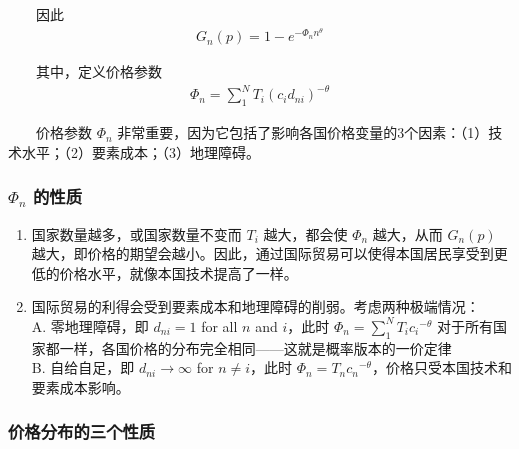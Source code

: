 \documentclass[]{article}
\providecommand{\tightlist}{%
  \setlength{\itemsep}{0pt}\setlength{\parskip}{0pt}}
\begin{document}
　　因此
\begin{align}
G_{n}(p)=1-e^{-\Phi_{n} n^{\theta}}  \label{eq:6}
\end{align}

　　其中，定义价格参数
\begin{align}
\Phi_{n} = \sum_{1}^{N}T_{i} ( {{c_i}d_{ni}})^{-\theta}  \label{eq:7}
\end{align}

　　价格参数 \(\Phi_n\) 非常重要，因为它包括了影响各国价格变量的3个因素：（1）技术水平；（2）要素成本；（3）地理障碍。

\hypertarget{phi_n-}{%
\subsubsection{\texorpdfstring{\(\Phi_n\) 的性质}{\textbackslash Phi\_n 的性质}}\label{phi_n-}}

\begin{enumerate}
\def\labelenumi{\arabic{enumi}.}
\tightlist
\item
  国家数量越多，或国家数量不变而 \(T_i\) 越大，都会使 \(\Phi_n\) 越大，从而 \(G_{n}(p)\) 越大，即价格的期望会越小。因此，通过国际贸易可以使得本国居民享受到更低的价格水平，就像本国技术提高了一样。\\
\item
  国际贸易的利得会受到要素成本和地理障碍的削弱。考虑两种极端情况：\\
  A. 零地理障碍，即 \(d_{n i}=1\) for all \(n\) and \(i\)，此时 \(\Phi_{n} = \sum_{1}^{N}T_{i}{c_i}^{-\theta}\) 对于所有国家都一样，各国价格的分布完全相同------这就是概率版本的一价定律\\
  B. 自给自足，即 \(d_{n i} \rightarrow \infty\) for \(n \neq i\)，此时 \(\Phi_{n} = T_{n}{c_n}^{-\theta}\)，价格只受本国技术和要素成本影响。
\end{enumerate}

\hypertarget{section-9}{%
\subsubsection{价格分布的三个性质}\label{section-9}}
\end{document}
